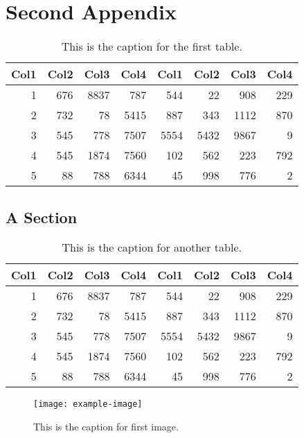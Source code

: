 \chapter{Second Appendix}
    \lipsum[1]
    \begin{table}
        \begin{tabular}{r r r r r r r r}
             Col1 & Col2 & Col3 & Col4 & Col1 & Col2 & Col3 & Col4 \\
             \hline
             1    & 676  & 8837 & 787  & 544  & 22   & 908  & 229  \\
             2    & 732  & 78   & 5415 & 887  & 343  & 1112 & 870  \\
             3    & 545  & 778  & 7507 & 5554 & 5432 & 9867 & 9    \\
             4    & 545  & 1874 & 7560 & 102  & 562  & 223  & 792  \\
             5    & 88   & 788  & 6344 & 45   & 998  & 776  & 2    \\
             \hline
        \end{tabular}
        \caption{This is the caption for the first table.}
    \end{table}
    \lipsum[2]

\section{A Section}
    \lipsum[3]
    \begin{table}
        \begin{tabular}{r r r r r r r r}
             Col1 & Col2 & Col3 & Col4 & Col1 & Col2 & Col3 & Col4 \\
             \hline
             1    & 676  & 8837 & 787  & 544  & 22   & 908  & 229  \\
             2    & 732  & 78   & 5415 & 887  & 343  & 1112 & 870  \\
             3    & 545  & 778  & 7507 & 5554 & 5432 & 9867 & 9    \\
             4    & 545  & 1874 & 7560 & 102  & 562  & 223  & 792  \\
             5    & 88   & 788  & 6344 & 45   & 998  & 776  & 2    \\
             \hline
        \end{tabular}
        \caption{This is the caption for another table.}
    \end{table}
    \lipsum[4-5]
    \begin{figure}
        \texttt{[image: example-image]}
        \caption{This is the caption for first image.}
    \end{figure}


